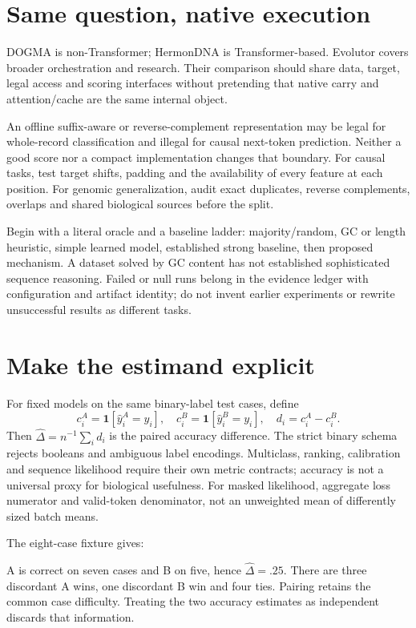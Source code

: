 \section{Same question, native execution}
DOGMA is non-Transformer; HermonDNA is Transformer-based. Evolutor covers broader
orchestration and research. Their comparison should share data, target, legal access
and scoring interfaces without pretending that native carry and attention/cache
are the same internal object.

An offline suffix-aware or reverse-complement representation may be legal for
whole-record classification and illegal for causal next-token prediction.
Neither a good score nor a compact implementation changes that boundary.
For causal tasks, test target shifts, padding and the availability of every feature
at each position. For genomic generalization, audit exact duplicates, reverse
complements, overlaps and shared biological sources before the split.

Begin with a literal oracle and a baseline ladder: majority/random,
GC or length heuristic, simple learned model, established strong baseline,
then proposed mechanism. A dataset solved by GC content has not established
sophisticated sequence reasoning. Failed or null runs belong in the evidence
ledger with configuration and artifact identity; do not invent earlier experiments
or rewrite unsuccessful results as different tasks.

\section{Make the estimand explicit}
For fixed models on the same binary-label test cases, define
\[
 c_i^A=\mathbf1[\hat y_i^A=y_i],\quad
 c_i^B=\mathbf1[\hat y_i^B=y_i],\quad d_i=c_i^A-c_i^B.
\]
Then $\hat\Delta=n^{-1}\sum_i d_i$ is the paired accuracy difference.
The strict binary schema rejects booleans and ambiguous label encodings.
Multiclass, ranking, calibration and sequence likelihood require their own
metric contracts; accuracy is not a universal proxy for biological usefulness.
For masked likelihood, aggregate loss numerator and valid-token denominator,
not an unweighted mean of differently sized batch means.

The eight-case fixture gives:
\begin{center}\end{center}
A is correct on seven cases and B on five, hence $\hat\Delta=.25$.
There are three discordant A wins, one discordant B win and four ties.
Pairing retains the common case difficulty. Treating the two accuracy estimates
as independent discards that information.

